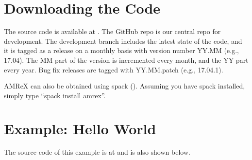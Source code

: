 \documentclass[letterpaper,10pt,english]{sphinxmanual}
\begin{document}
\section{Downloading the Code}
\label{\detokenize{GettingStarted:downloading-the-code}}\label{\detokenize{GettingStarted::doc}}
\sphinxAtStartPar
The source code is available at . The
GitHub repo is our central repo for development. The development branch
includes the latest state of the code, and it is tagged as a release
on a monthly basis with version number YY.MM (e.g., 17.04). The MM part of the
version is incremented every month, and the YY part every year.  Bug fix
releases are tagged with YY.MM.patch (e.g., 17.04.1).

\sphinxAtStartPar
AMReX can also be obtained using spack ().  Assuming
you have spack installed, simply type “spack install amrex”.


\section{Example: Hello World}
\label{\detokenize{GettingStarted:example-hello-world}}
\sphinxAtStartPar
The source code of this example is at 
and is also shown below.

\begin{sphinxVerbatim}[commandchars=\\\{\}]
 
 

    \PYG{p}{[}\PYG{p}{]}
      
                      
\end{sphinxVerbatim}
\end{document}

